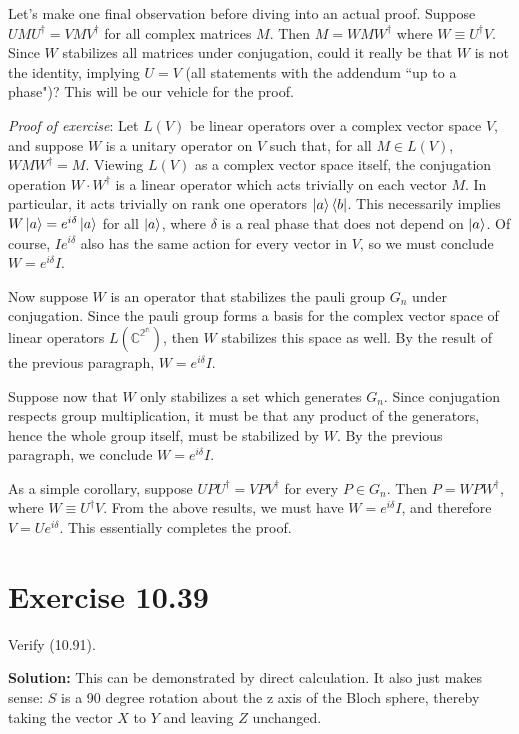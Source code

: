 \documentclass{book}
\begin{document}
    Let's make one final observation before diving into an actual proof. Suppose $U M U^\dagger = V M V^\dagger$ for all complex matrices $M$. Then $M = W M W^\dagger$ where $W \equiv U^\dagger V$. Since $W$ stabilizes all matrices under conjugation, could it really be that $W$ is not the identity, implying $U = V$ (all statements with the addendum ``up to a phase")? This will be our vehicle for the proof. 
    
    \emph{Proof of exercise}: Let $L(V)$ be linear operators over a complex vector space $V$, and suppose $W$ is a unitary operator on $V$ such that, for all $M \in L(V)$, $W M W^\dagger = M$. Viewing $L(V)$ as a complex vector space itself, the conjugation operation $W \cdot W^\dagger$ is a linear operator which acts trivially on each vector $M$. In particular, it acts trivially on rank one operators $\ket{a}\bra{b}$. This necessarily implies $W \ket{a} = e^{i\delta} \ket{a}$ for all $\ket{a}$, where $\delta$ is a real phase that does not depend on $\ket{a}$. Of course, $I e^{i\delta}$ also has the same action for every vector in $V$, so we must conclude $W = e^{i\delta} I$. 
    
    Now suppose $W$ is an operator that stabilizes the pauli group $G_n$ under conjugation. Since the pauli group forms a basis for the complex vector space of linear operators $L(\mathbb{C^{2^n}})$, then $W$ stabilizes this space as well. By the result of the previous paragraph, $W = e^{i\delta} I$.
    
    Suppose now that $W$ only stabilizes a set which generates $G_n$. Since conjugation respects group multiplication, it must be that any product of the generators, hence the whole group itself, must be stabilized by $W$. By the previous paragraph, we conclude $W = e^{i\delta} I $.
    
    As a simple corollary, suppose $U P U^\dagger = V P V^\dagger$ for every $P\in G_n$. Then $P = W P W^\dagger$, where $W \equiv U^\dagger V$. From the above results, we must have $W = e^{i\delta}I$, and therefore $V = U e^{i\delta}$. This essentially completes the proof.
    
\section*{Exercise 10.39}
    Verify (10.91).
    
    \textbf{Solution:} This can be demonstrated by direct calculation. It also just makes sense: $S$ is a 90 degree rotation about the z axis of the Bloch sphere, thereby taking the vector $X$ to $Y$ and leaving $Z$ unchanged. 
    
\end{document}

